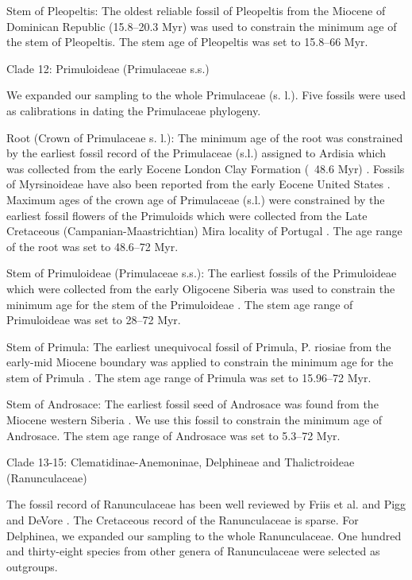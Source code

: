 \documentclass[10pt]{article}
\begin{document}
Stem of Pleopeltis: The oldest reliable fossil of Pleopeltis from the
Miocene of Dominican Republic (15.8--20.3 Myr) \citep{Schneider,
  Schmidt et al. 2015} was used to constrain the minimum age of the
stem of Pleopeltis. The stem age of Pleopeltis was set to 15.8--66
Myr.

Clade 12: Primuloideae (Primulaceae s.s.)

We expanded our sampling to the whole Primulaceae (s. l.). Five
fossils were used as calibrations in dating the Primulaceae
phylogeny. 

Root (Crown of Primulaceae s. l.): The minimum age of the root was
constrained by the earliest fossil record of the Primulaceae (s.l.)
assigned to Ardisia which was collected from the early Eocene London
Clay Formation (~48.6 Myr) \citep{Collinson 1984}. Fossils of
Myrsinoideae have also been reported from the early Eocene United
States \citep{Irving and Stuessy 1971}. Maximum ages of the crown age
of Primulaceae (s.l.) were constrained by the earliest fossil flowers
of the Primuloids which were collected from the Late Cretaceous
(Campanian-Maastrichtian) Mira locality of Portugal \citep{Friis,
  Crane et al. 2011}. The age range of the root was set to 48.6--72
Myr.

Stem of Primuloideae (Primulaceae s.s.): The earliest fossils of the
Primuloideae which were collected from the early Oligocene Siberia was
used to constrain the minimum age for the stem of the Primuloideae
\citep{Nikitin 2006}. The stem age range of Primuloideae was set to
28--72 Myr.

Stem of Primula: The earliest unequivocal fossil of Primula,
P. riosiae from the early-mid Miocene boundary was applied to
constrain the minimum age for the stem of Primula \citep{de Vos,
  Hughes et al. 2014}. The stem age range of Primula was set to
15.96--72 Myr.

Stem of Androsace: The earliest fossil seed of Androsace was found
from the Miocene western Siberia \citep{Dorofeev 1963}. We use this
fossil to constrain the minimum age of Androsace. The stem age range
of Androsace was set to 5.3--72 Myr.

Clade 13-15: Clematidinae-Anemoninae, Delphineae and Thalictroideae
(Ranunculaceae)

The fossil record of Ranunculaceae has been well reviewed by Friis et
al. \citep{Friis, Crane et al. 2011} and Pigg and DeVore \citep{Pigg
  and DeVore 2005}. The Cretaceous record of the Ranunculaceae is
sparse. For Delphinea, we expanded our sampling to the whole
Ranunculaceae. One hundred and thirty-eight species from other genera
of Ranunculaceae were selected as outgroups. 
\end{document}
